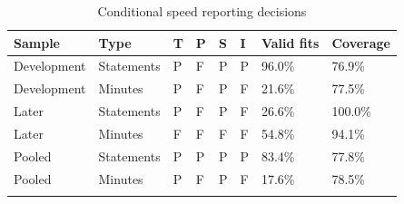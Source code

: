 \begin{table}[htbp]
\centering
{\fontsize{9.7}{12}\selectfont\renewcommand{\arraystretch}{1.22}\setlength{\tabcolsep}{4pt}
\begin{tabularx}{\linewidth}{@{}L{27mm}L{23mm}C{8mm}C{8mm}C{8mm}C{8mm}C{25mm}X@{}}
\toprule{}
\textbf{Sample} & \textbf{Type} & \textbf{T} & \textbf{P} & \textbf{S} & \textbf{I} & \textbf{Valid fits} & \textbf{Coverage} \\ \midrule
Development & Statements & P & F & P & P & 96.0\% & 76.9\% \\ \hline
Development & Minutes & P & F & P & F & 21.6\% & 77.5\% \\ \hline
Later & Statements & P & F & P & F & 26.6\% & 100.0\% \\ \hline
Later & Minutes & F & F & F & F & 54.8\% & 94.1\% \\ \hline
Pooled & Statements & P & P & P & P & 83.4\% & 77.8\% \\ \hline
Pooled & Minutes & P & F & P & F & 17.6\% & 78.5\% \\ \hline
{}\bottomrule\end{tabularx}}
\caption[Conditional speed reporting decisions]{Conditional speed reporting decisions}\label{tab:gates}
\end{table}
